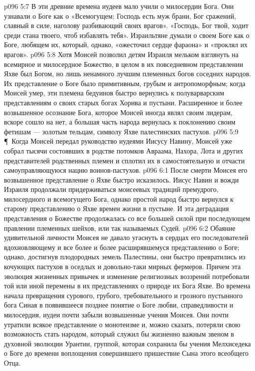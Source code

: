\vs p096 5:7 В эти древние времена иудеев мало учили о милосердии Бога. Они узнавали о Боге как о «Всемогущем; Господь есть муж брани, Бог сражений, славный в силе, наголову разбивающий своих врагов». «Господь, Бог твой, ходит среди стана твоего, чтоб избавлять тебя». Израильтяне думали о своем Боге как о Боге, любящем их, который, однако, «ожесточил сердце фараона» и «проклял их врагов».
\vs p096 5:8 Хотя Моисей позволил детям Израиля мельком взглянуть на всемирное и милосердное Божество, в целом в их повседневном представлении Яхве был Богом, но лишь ненамного лучшим племенных богов соседних народов. Их представление о Боге было примитивным, грубым и антропоморфным; когда Моисей умер, эти племена бедуинов быстро вернулись к полуварварским представлениям о своих старых богах Хорива и пустыни. Расширенное и более возвышенное осознание Бога, которое Моисей иногда являл своим лидерам, вскоре сошло на нет, а большая часть народа вернулась к поклонению своим фетишам --- золотым тельцам, символу Яхве палестинских пастухов.
\vs p096 5:9 \P\ Когда Моисей передал руководство иудеями Иисусу Навину, Моисей уже собрал тысячи состоявших в родстве потомков Авраама, Нахора, Лота и других представителей родственных племен и сплотил их в самостоятельную и отчасти самоуправляющуюся нацию воинов\hyp{}пастухов.
\vs p096 6:1 После смерти Моисея его возвышенное представление о Яхве быстро исказилось. Иисус Навин и вожди Израиля продолжали придерживаться моисеевых традиций премудрого, милосердного и всемогущего Бога, однако простой народ быстро вернулся к старому представлению о Яхве времен жизни в пустыне. И эта деградация представления о Божестве продолжалась со все большей силой при последующем правлении племенных шейхов, или так называемых Судей.
\vs p096 6:2 Обаяние удивительной личности Моисея не давало угаснуть в сердцах его последователей вдохновляющему и все более и более расширявшемуся представлению о Боге; однако, достигнув плодородных земель Палестины, они быстро превратились из кочующих пастухов в оседлых и довольно\hyp{}таки мирных фермеров. Причем эта эволюция жизненных привычек и изменение религиозных воззрений потребовали той или иной перемены в их представлениях о природе их Бога Яхве. Во времена начала превращения сурового, грубого, требовательного и грозного пустынного бога Синая в появившееся позднее понятие о Боге любви, справедливости и милосердия, иудеи почти забыли возвышенные учения Моисея. Они почти утратили всякое представление о монотеизме и, можно сказать, потеряли свою возможность стать народом, который служил бы жизненно важным звеном в духовной эволюции Урантии, группой, которая сохранила бы учения Мелхиседека о Боге до времени воплощения совершившего пришествие Сына этого всеобщего Отца.
